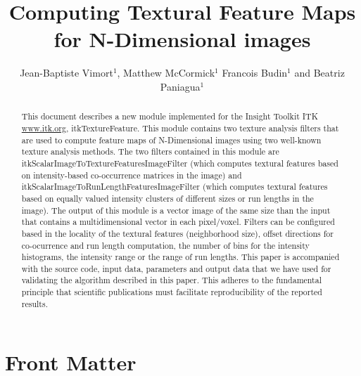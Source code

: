 \documentclass{InsightArticle}
\title{Computing Textural Feature Maps for N-Dimensional images}
\author{Jean-Baptiste Vimort$^{1}$, Matthew McCormick$^{1}$ Francois Budin$^{1}$ and Beatriz Paniagua$^{1}$}
\newcommand{\IJhandlerIDnumber}{1338}
\begin{document}
%
%
\IJhandlefooter{\IJhandlerIDnumber}


\ifpdf
\else
\fi


\maketitle


\ifhtml
\chapter*{Front Matter\label{front}}
\fi


\begin{abstract}
\noindent
This document describes a new module implemented for the Insight Toolkit ITK \url{www.itk.org}, itkTextureFeature. This module contains two texture analysis filters that are used to compute feature maps of N-Dimensional images using two well-known texture analysis methods. The two filters contained in this module are itkScalarImageToTextureFeaturesImageFilter (which computes textural features based on intensity-based co-occurrence matrices in the image) and itkScalarImageToRunLengthFeaturesImageFilter (which computes textural features based on equally valued intensity clusters of different sizes or run lengths in the image). The output of this module is a vector image of the same size than the input that contains a multidimensional vector in each pixel/voxel. Filters can be configured based in the locality of the textural features (neighborhood size), offset directions for co-ocurrence and run length computation, the number of bins for the intensity histograms, the intensity range or the range of run lengths. This paper is accompanied with the source code, input data, parameters and output data that we have used for validating the algorithm described in this paper. This adheres to the fundamental principle that scientific publications must facilitate reproducibility of the reported results.

\end{abstract}
\end{document}
